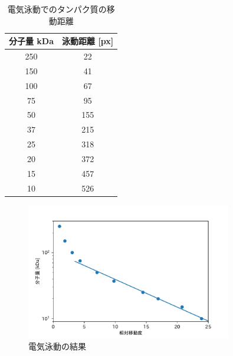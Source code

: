 \documentclass[a4paper]{ltjsarticle}
\begin{document}
\begin{table}[p]
    \centering
    \caption{電気泳動でのタンパク質の移動距離}
    \label{table:kyori}
    \begin{tabular}{cc}
        \hline
        分子量 kDa & 泳動距離 [px] \\
        \hline
        250 & 22 \\
        150 & 41 \\
        100 & 67 \\
        75 & 95 \\
        50 & 155 \\
        37 & 215 \\
        25 & 318 \\
        20 & 372 \\
        15 & 457 \\
        10 & 526 \\
        \hline
    \end{tabular}
\end{table}

\begin{figure}[p]
    \begin{center}
        \includegraphics[width=0.8\textwidth]{kenryo.pdf}
        \caption{電気泳動の結果}
        \label{fig:kenryo}
    \end{center}
\end{figure}
\end{document}
